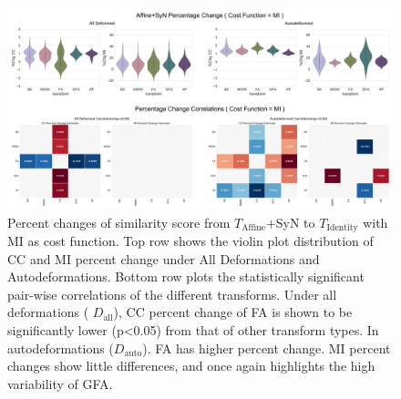 {    \thispagestyle{empty}%
    \begin{landscape}%
        \begin{figure}[p]
        \includegraphics[width=\linewidth]{sup2}
        \caption{Percent changes of similarity score from \protect $T_{\text{Affine}}$+SyN to \protect $T_{\text{Identity}}$ with MI as cost function. Top row shows the violin plot distribution of CC and MI percent change under All Deformations and Autodeformations. Bottom row plots the statistically significant pair-wise correlations of the different transforms.
        Under all deformations ( \protect$D_{\text{all}}$), CC percent change of FA is shown to be significantly lower (p<0.05) from that of other transform types. In autodeformations (\protect$D_{\text{auto}}$). FA has higher percent change. MI percent changes show little differences, and once again highlights the high variability of GFA. }
        \centering
        \label{fig:APSup2}
        \end{figure}
    \end{landscape}
}